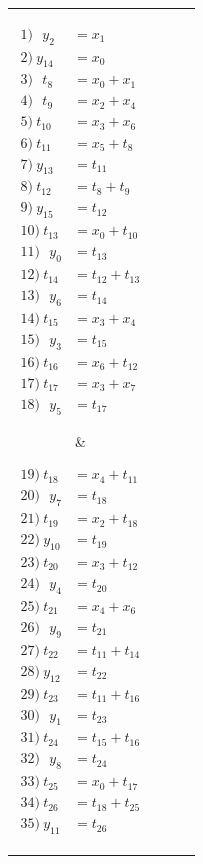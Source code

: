 {\begin{tabular}{| c c | c c |}
\parbox{0.2\linewidth}{%
\begin{align*}
1)\:\:\:y_2 & = x_1\\ 
2)\:y_{14} & = x_0\\ 
3)\:\:\:t_8 & = x_0 + x_1\\ 
4)\:\:\:t_9 & = x_2 + x_4\\ 
5)\:t_{10} & = x_3 + x_6\\ 
6)\:t_{11} & = x_5 + t_8\\ 
7)\:y_{13} & = t_{11}\\ 
8)\:t_{12} & = t_8 + t_9\\ 
9)\:y_{15} & = t_{12}\\ 
10)\:t_{13} & = x_0 + t_{10}\\ 
11)\:\:\:y_0 & = t_{13}\\ 
12)\:t_{14} & = t_{12} + t_{13}\\ 
13)\:\:\:y_6 & = t_{14}\\ 
14)\:t_{15} & = x_3 + x_4\\ 
15)\:\:\:y_3 & = t_{15}\\ 
16)\:t_{16} & = x_6 + t_{12}\\ 
17)\:t_{17} & = x_3 + x_7\\ 
18)\:\:\:y_5 & = t_{17}
\end{align*}}
    & 
\parbox{0.2\linewidth}{%
\begin{align*}
19)\:t_{18} & = x_4 + t_{11}\\ 
20)\:\:\:y_7 & = t_{18}\\ 
21)\:t_{19} & = x_2 + t_{18}\\ 
22)\:y_{10} & = t_{19}\\ 
23)\:t_{20} & = x_3 + t_{12}\\ 
24)\:\:\:y_4 & = t_{20}\\ 
25)\:t_{21} & = x_4 + x_6\\ 
26)\:\:\:y_9 & = t_{21}\\ 
27)\:t_{22} & = t_{11} + t_{14}\\ 
28)\:y_{12} & = t_{22}\\ 
29)\:t_{23} & = t_{11} + t_{16}\\ 
30)\:\:\:y_1 & = t_{23}\\ 
31)\:t_{24} & = t_{15} + t_{16}\\ 
32)\:\:\:y_8 & = t_{24}\\ 
33)\:t_{25} & = x_0 + t_{17}\\ 
34)\:t_{26} & = t_{18} + t_{25}\\ 
35)\:y_{11} & = t_{26}
\end{align*}} \\ \hline
{} &  \\ \hline
\end{tabular}
}

